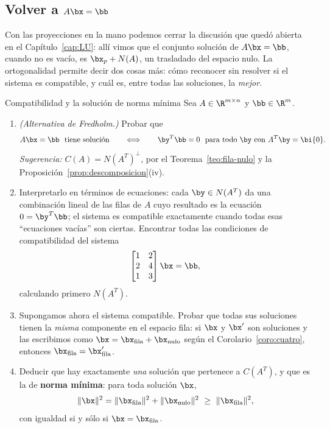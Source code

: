 \subsection*{Volver a $A\bx=\bb$}

Con las proyecciones en la mano podemos cerrar la discusión que quedó abierta
en el Capítulo~\ref{cap:LU}: allí vimos que el conjunto solución de
$A\bx=\bb$, cuando no es vacío, es $\bx_p+N(A)$, un trasladado del espacio
nulo. La ortogonalidad permite decir dos cosas más: cómo reconocer sin
resolver si el sistema es compatible, y cuál es, entre todas las soluciones,
la \emph{mejor}.

\begin{entrega}{Compatibilidad y la solución de norma mínima}
\label{ent:norma-minima}
Sea $A\in\R^{m\times n}$ y $\bb\in\R^m$.

\begin{enumerate}[label=\textbf{(\alph*)},itemsep=3pt,topsep=4pt]
\item \emph{(Alternativa de Fredholm.)} Probar que
\[
A\bx=\bb \ \text{ tiene solución}
\qquad\Longleftrightarrow\qquad
\by^T\bb=0 \ \text{ para todo } \by \text{ con } A^T\by=\bi{0}.
\]
\emph{Sugerencia:} $C(A)=N(A^T)^{\perp}$, por el Teorema~\ref{teo:fila-nulo}
y la Proposición~\ref{prop:descomposicion}(iv).

\item Interpretarlo en términos de ecuaciones: cada $\by\in N(A^T)$ da una
combinación lineal de las filas de $A$ cuyo resultado es la ecuación
$0=\by^T\bb$; el sistema es compatible exactamente cuando todas esas
``ecuaciones vacías'' son ciertas. Encontrar todas las condiciones de
compatibilidad del sistema
\[
\begin{bmatrix} 1&2\\ 2&4\\ 1&3\end{bmatrix}\bx = \bb ,
\]
calculando primero $N(A^T)$.

\item Supongamos ahora el sistema compatible. Probar que todas sus soluciones
tienen la \emph{misma} componente en el espacio fila: si $\bx$ y $\bx'$ son
soluciones y las escribimos como
$\bx=\bx_{\text{fila}}+\bx_{\text{nulo}}$ según el
Corolario~\ref{coro:cuatro}, entonces
$\bx_{\text{fila}}=\bx'_{\text{fila}}$.

\item Deducir que hay exactamente \emph{una} solución que pertenece a
$C(A^T)$, y que es la de \textbf{norma mínima}: para toda solución $\bx$,
\[
\|\bx\|^2=\|\bx_{\text{fila}}\|^2+\|\bx_{\text{nulo}}\|^2
\ \ge\ \|\bx_{\text{fila}}\|^2 ,
\]
con igualdad si y sólo si $\bx=\bx_{\text{fila}}$.


\end{enumerate}
\end{entrega}

